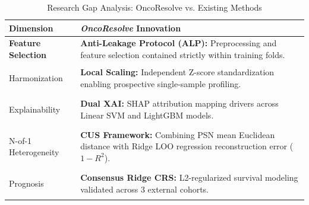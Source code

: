 \documentclass[10pt,a4paper,twocolumn]{article}
\renewcommand{\arraystretch}{1.2}
\begin{document}
\begin{table}[htbp]
\centering
\caption{Research Gap Analysis: OncoResolve vs. Existing Methods}
\label{tab:gap_analysis}
\small
\renewcommand{\arraystretch}{1.2}

\begin{tabularx}{\columnwidth}{
  >{\bfseries\RaggedRight\arraybackslash}p{2.1cm}
  >{\RaggedRight\arraybackslash}X
}
\toprule

\textbf{Dimension} & 
\textbf{\textit{OncoResolve} Innovation} \\

\midrule

Feature Selection & \textbf{Anti-Leakage Protocol (ALP):} Preprocessing and feature selection contained strictly within training folds. \\

\addlinespace

Harmonization & \textbf{Local Scaling:} Independent Z-score standardization enabling prospective single-sample profiling. \\

\addlinespace

Explainability & \textbf{Dual XAI:} SHAP attribution mapping drivers across Linear SVM and LightGBM models. \\

\addlinespace

N-of-1 Heterogeneity & \textbf{CUS Framework:} Combining PSN mean Euclidean distance with Ridge LOO regression reconstruction error ($1 - R^2$). \\

\addlinespace

Prognosis & \textbf{Consensus Ridge CRS:} L2-regularized survival modeling validated across 3 external cohorts. \\

\bottomrule
\end{tabularx}
\end{table}
\end{document}
